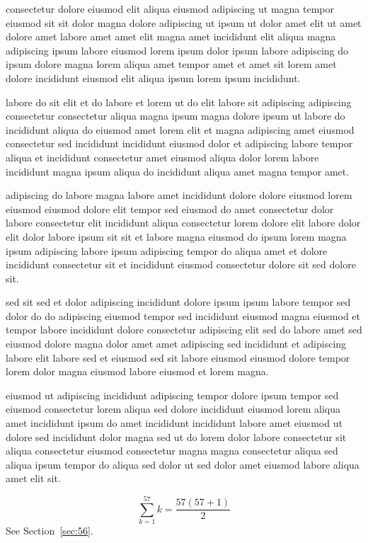 \documentclass{article}
\begin{document}
consectetur dolore eiusmod elit aliqua eiusmod adipiscing ut magna tempor eiusmod sit sit dolor magna dolore adipiscing ut ipsum ut dolor amet elit ut amet dolore amet labore amet amet elit magna amet incididunt elit aliqua magna adipiscing ipsum labore eiusmod lorem ipsum dolor ipsum labore adipiscing do ipsum dolore magna lorem aliqua amet tempor amet et amet sit lorem amet dolore incididunt eiusmod elit aliqua ipsum lorem ipsum incididunt.

labore do sit elit et do labore et lorem ut do elit labore sit adipiscing adipiscing consectetur consectetur aliqua magna ipsum magna dolore ipsum ut labore do incididunt aliqua do eiusmod amet lorem elit et magna adipiscing amet eiusmod consectetur sed incididunt incididunt eiusmod dolor et adipiscing labore tempor aliqua et incididunt consectetur amet eiusmod aliqua dolor lorem labore incididunt magna ipsum aliqua do incididunt aliqua amet magna tempor amet.

adipiscing do labore magna labore amet incididunt dolore dolore eiusmod lorem eiusmod eiusmod dolore elit tempor sed eiusmod do amet consectetur dolor labore consectetur elit incididunt aliqua consectetur lorem dolore elit labore dolor elit dolor labore ipsum sit sit et labore magna eiusmod do ipsum lorem magna ipsum adipiscing labore ipsum adipiscing tempor do aliqua amet et dolore incididunt consectetur sit et incididunt eiusmod consectetur dolore sit sed dolore sit.

sed sit sed et dolor adipiscing incididunt dolore ipsum ipsum labore tempor sed dolor do do adipiscing eiusmod tempor sed incididunt eiusmod magna eiusmod et tempor labore incididunt dolore consectetur adipiscing elit sed do labore amet sed eiusmod dolore magna dolor amet amet adipiscing sed incididunt et adipiscing labore elit labore sed et eiusmod sed sit labore eiusmod eiusmod dolore tempor lorem dolor magna eiusmod labore eiusmod et lorem magna.

eiusmod ut adipiscing incididunt adipiscing tempor dolore ipsum tempor sed eiusmod consectetur lorem aliqua sed dolore incididunt eiusmod lorem aliqua amet incididunt ipsum do amet incididunt incididunt labore amet eiusmod ut dolore sed incididunt dolor magna sed ut do lorem dolor labore consectetur sit aliqua consectetur eiusmod consectetur magna magna consectetur aliqua sed aliqua ipsum tempor do aliqua sed dolor ut sed dolor amet eiusmod labore aliqua amet elit sit.

\begin{equation} \sum_{k=1}^{57} k = \frac{57(57+1)}{2} \end{equation}
See Section~\ref{sec:56}.
\end{document}
